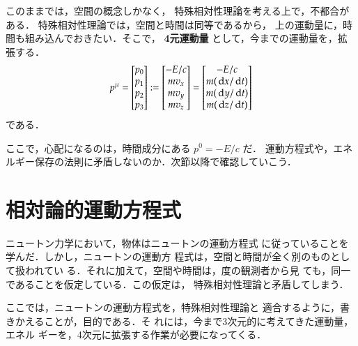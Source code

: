     このままでは，空間の概念しかなく，
    特殊相対性理論を考える上で，不都合がある．
    特殊相対性理論では，空間と時間は同等であるから，
    上の運動量に，時間も組み込んでおきたい．そこで，
    \textbf{4元運動量} として，今までの運動量を，拡張する．
        \begin{align}
            p^{\mu} =
            \begin{bmatrix}
                p_{0} \\
                p_{1} \\
                p_{2} \\
                p_{3}
            \end{bmatrix}
            :=
            \begin{bmatrix}
                -E/c   \\
                mv_{x} \\
                mv_{y} \\
                mv_{z}
            \end{bmatrix}
            =
            \begin{bmatrix}
                -{E/c} \\
                m(\,\mathrm{d} x/\,\mathrm{d} t) \\
                m(\,\mathrm{d} y/\,\mathrm{d} t) \\
                m(\,\mathrm{d} z/\,\mathrm{d} t)
            \end{bmatrix}
        \end{align}
    である．

    ここで，心配になるのは，時間成分にある $p^{0}=-E/c$ だ．
    運動方程式や，エネルギー保存の法則に矛盾しないのか．次節以降で確認していこう．

\section{相対論的運動方程式}
    \begin{mycomment}
        ニュートン力学において，物体はニュートンの運動方程式
        に従っていることを学んだ．しかし，ニュートンの運動方
        程式は，空間と時間が全く別のものとして扱われてい
        る．それに加えて，空間や時間は，度の観測者から見
        ても，同一であることを仮定している．この仮定は，
        特殊相対性理論と矛盾してしまう．

        ここでは，ニュートンの運動方程式を，特殊相対性理論と
        適合するように，書きかえることが，目的である．そ
        れには，今まで3次元的に考えてきた運動量，エネル
        ギーを，4次元に拡張する作業が必要になってくる．
    \end{mycomment}

